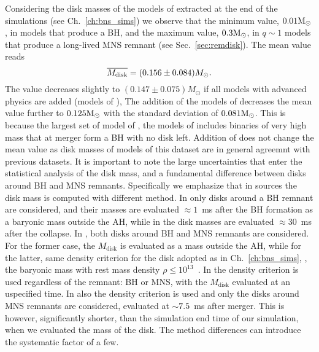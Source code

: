 Considering the disk masses of the models of \DSrefset{} extracted at the end of the 
simulations (see Ch.~\ref{ch:bns_sims}) we observe that the minimum value, $0.01{\text{M}_{\odot}}$, in 
models that produce a \ac{BH}, and the maximum value, $0.3{\text{M}_{\odot}}$, in $q\sim1$ models that produce 
a long-lived \ac{MNS} remnant (see Sec.~\ref{sec:remdisk}).
The mean value reads 
\begin{equation}
\overline{M_{\rm disk}} = (0.156 \pm 0.084) M_{\odot}.
\end{equation}
The value decreases slightly to $(0.147 \pm 0.075)M_{\odot}$ 
if all models with advanced physics are added (models of \DSheatcool{}),
The addition of the models of \DScool{} decreases the mean value further to $0.125{\text{M}_{\odot}}$ with the 
standard deviation of $0.081{\text{M}_{\odot}}$. This is because the largest set of model of \DScool{}, 
the models of \citet{Radice:2018pdn} includes binaries of very high mass that at merger form
a \ac{BH} with no disk left.
Addition of \DSnone{} does not change the mean value as disk masses of models of this dataset 
are in general agreemnt with previous datasets.
It is important to note the large uncertainties that enter the statistical analysis of the disk mass,
and a fundamental difference between disks around \ac{BH} and \ac{MNS} remnants.
Specifically we emphasize that in sources the disk mass is computed with different method.
In \citet{Dietrich:2015iva,Dietrich:2016hky} only disks around a \ac{BH} remnant are considered, 
and their masses are evaluated ${\approx}1$~ms after the \ac{BH} formation as a baryonic mass 
outside the \ac{AH}, while in \citet{Sekiguchi:2016bjd} the disk masses are evaluated 
${\approx}30$~ms after the collapse.
In \citet{Radice:2018pdn}, both disks around \ac{BH} and \ac{MNS} remnants are considered. 
For the former case, the $M_{\text{disk}}$ is evaluated as a mass outside the \ac{AH}, while for
the latter, same density criterion for the disk adopted as in Ch.~\ref{ch:bns_sims}, \ie, the 
baryonic mass with rest mass density $\rho\leq10^{13}$~\gcm.
In \citet{Kiuchi:2019lls} the density criterion is used regardless of the remnant: 
\ac{BH} or \ac{MNS}, with the $M_{\text{disk}}$ evaluated at an uspecified time.
In \citet{Vincent:2019kor} also the density criterion is used and only the disks around 
\ac{MNS} remnants are considered, evaluated at ${\sim}7.5$~ms after merger. This is however,
significantly shorter, than the simulation end time of our simulation, when we evaluated the 
mass of the disk. 
The method differences can introduce the systematic factor of a few.

